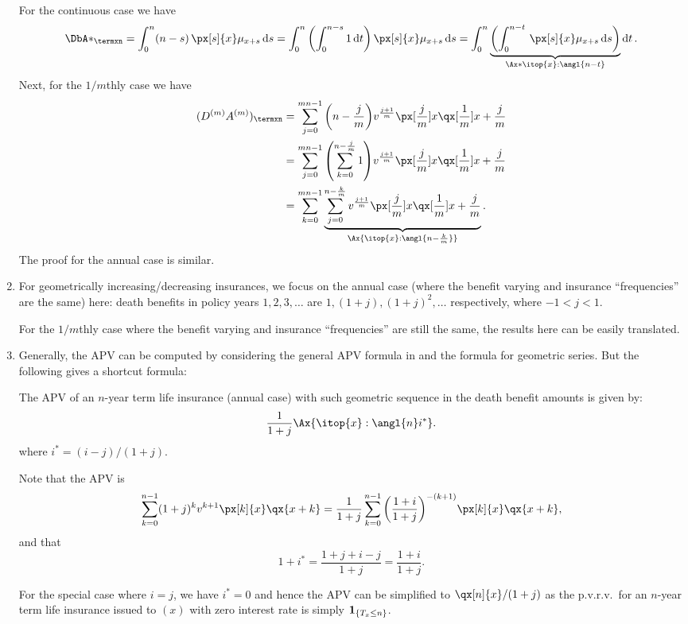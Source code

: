 \begin{enumerate}
\begin{pf}
For the continuous case we have
\[
\DbA*_{\termxn}=\int_{0}^{n}(n-s)\,\px[s]{x}\mu_{x+s}\dd{s}
=\int_{0}^{n}\qty(\int_{0}^{n-s}1\dd{t})\,\px[s]{x}\mu_{x+s}\dd{s}
=\int_{0}^{n}\underbrace{\qty(\int_{0}^{n-t}\,\px[s]{x}\mu_{x+s}\dd{s})}_{\Ax*{\itop{x}:\angl{n-t}}}\dd{t}.
\]
Next, for the \(1/m\)thly case we have
\begin{align*}
(D^{(m)}A^{(m)})_{\termxn}
&=\sum_{j=0}^{mn-1}\qty(n-\frac{j}{m})
v^{\frac{j+1}{m}}\px[\frac{j}{m}]{x}\qx[\frac{1}{m}]{x+\frac{j}{m}}\\
&=\sum_{j=0}^{mn-1}\qty(\sum_{k=0}^{n-\frac{j}{m}}1)v^{\frac{j+1}{m}}\px[\frac{j}{m}]{x}\qx[\frac{1}{m}]{x+\frac{j}{m}}\\
&=\sum_{k=0}^{mn-1}\underbrace{\sum_{j=0}^{n-\frac{k}{m}}v^{\frac{j+1}{m}}\px[\frac{j}{m}]{x}\qx[\frac{1}{m}]{x+\frac{j}{m}}}_{\Ax{\itop{x}:\angl{n-\frac{k}{m}}}}.
\end{align*}
The proof for the annual case is similar.
\end{pf}
\item \label{it:geo-vb-insurance-intro}
For geometrically increasing/decreasing insurances, we focus on the
annual case (where the benefit varying and insurance ``frequencies'' are the
same) here: death benefits in policy years \(1,2,3,\dotsc\) are
\(1,(1+j),(1+j)^2,\dotsc\) respectively, where \(-1<j<1\).

\begin{note}
For the \(1/m\)thly case where the benefit varying and insurance
``frequencies'' are still the same, the results here can be easily translated.
\end{note}
\item Generally, the APV can be computed by considering the general APV formula
in  and the formula for geometric series. But the
following gives a shortcut formula:
\begin{proposition}
\label{prp:gs-term-life-fmla}
The APV of an \(n\)-year term life insurance (annual case) with such geometric
sequence in the death benefit amounts is given by:
\[
\frac{1}{1+j}\Ax{\itop{x}:\angl{n}i^*}.
\]
where \(i^*=(i-j)/(1+j)\).
\end{proposition}
\begin{pf}
Note that the APV is
\[
\sum_{k=0}^{n-1}(1+j)^kv^{k+1}\px[k]{x}\qx{x+k}
=\frac{1}{1+j}\sum_{k=0}^{n-1}\qty(\frac{1+i}{1+j})^{-(k+1)}\px[k]{x}\qx{x+k},
\]
and that
\[
1+i^*=\frac{1+j+i-j}{1+j}=\frac{1+i}{1+j}.
\]
\end{pf}

\begin{note}
For the special case where \(i=j\), we have \(i^*=0\) and hence the APV can be
simplified to \(\qx[n]{x}/(1+j)\) as the p.v.r.v.\ for an \(n\)-year term life
insurance issued to \((x)\) with zero interest rate is simply
\(\mathbf{1}_{\left\{T_x\le n\right\}}\).
\end{note}
\end{enumerate}

